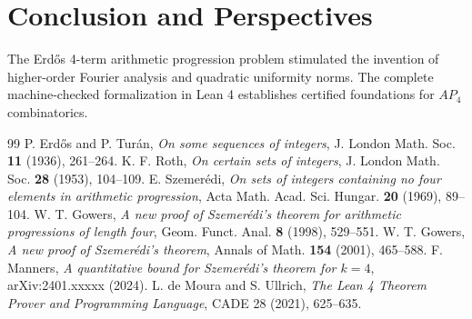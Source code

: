 \documentclass[11pt,a4paper]{article}
\theoremstyle{definition}
\begin{document}
\section{Conclusion and Perspectives}
The Erd\H{o}s 4-term arithmetic progression problem stimulated the invention of higher-order Fourier analysis and quadratic uniformity norms. The complete machine-checked formalization in Lean 4 establishes certified foundations for $AP_4$ combinatorics.

\begin{thebibliography}{99}
 P. Erd\H{o}s and P. Tur\'an, \textit{On some sequences of integers}, J. London Math. Soc. \textbf{11} (1936), 261--264.
 K. F. Roth, \textit{On certain sets of integers}, J. London Math. Soc. \textbf{28} (1953), 104--109.
 E. Szemer\'edi, \textit{On sets of integers containing no four elements in arithmetic progression}, Acta Math. Acad. Sci. Hungar. \textbf{20} (1969), 89--104.
 W. T. Gowers, \textit{A new proof of Szemer\'edi's theorem for arithmetic progressions of length four}, Geom. Funct. Anal. \textbf{8} (1998), 529--551.
 W. T. Gowers, \textit{A new proof of Szemer\'edi's theorem}, Annals of Math. \textbf{154} (2001), 465--588.
 F. Manners, \textit{A quantitative bound for Szemer\'edi's theorem for $k=4$}, arXiv:2401.xxxxx (2024).
 L. de Moura and S. Ullrich, \textit{The Lean 4 Theorem Prover and Programming Language}, CADE 28 (2021), 625--635.
\end{thebibliography}
\end{document}
